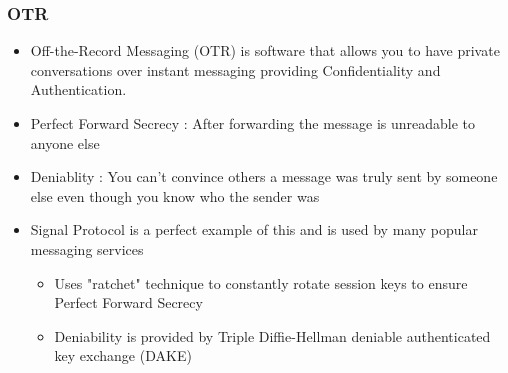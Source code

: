 \documentclass[twoside]{article}
\begin{document}
\subsubsection{OTR}
\begin{itemize}
\item Off-the-Record Messaging (OTR) is software that allows you to have private conversations over instant messaging providing Confidentiality and Authentication.
\item Perfect Forward Secrecy : After forwarding the message is unreadable to anyone else
\item Deniablity : You can't convince others a message was truly sent by someone else even though you know who the sender was
\item Signal Protocol is a perfect example of this and is used by many popular messaging services
\begin{itemize}
\item Uses "ratchet" technique to constantly rotate session keys to ensure Perfect Forward Secrecy
\item Deniability is provided by Triple Diffie-Hellman deniable authenticated key exchange (DAKE)
\end{itemize}
\end{itemize}
\end{document}
